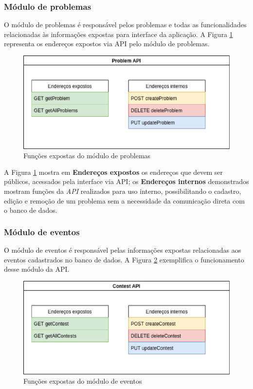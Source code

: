 \subsubsection{Módulo de problemas}
\label{subsubsec:moduloDeProblemas}

O módulo de problemas é responsável pelos problemas e todas as funcionalidades relacionadas às informações expostas para interface da aplicação. A Figura \ref{fig:problems_endpoints} representa os endereços expostos via API pelo módulo de problemas.

\begin{figure}[H]
    \centering
    \includegraphics[keepaspectratio=true,scale=0.5]{figuras/problems_endpoins.eps}
    \caption{Funções expostas do módulo de problemas}
    \label{fig:problems_endpoints}
\end{figure}

A Figura \ref{fig:problems_endpoints} mostra em \textbf{Endereços expostos} os endereços que devem ser públicos, acessados pela interface via API; os \textbf{Endereços internos} demonstrados mostram funções da \textit{API} realizados para uso interno, possibilitando o cadastro, edição e remoção de um problema sem a necessidade da comunicação direta com o banco de dados.

\subsubsection{Módulo de eventos}
\label{subsec:moduloDeEventos}

O módulo de eventos é responsável pelas informações expostas relacionadas aos eventos cadastrados no banco de dados. A Figura \ref{fig:contests_endpoint} exemplifica o funcionamento desse módulo da API.

\begin{figure}[H]
    \centering
    \includegraphics[keepaspectratio=true,scale=0.5]{figuras/contests_endpoint.eps}
    \caption{Funções expostas do módulo de eventos}
    \label{fig:contests_endpoint}
\end{figure}

